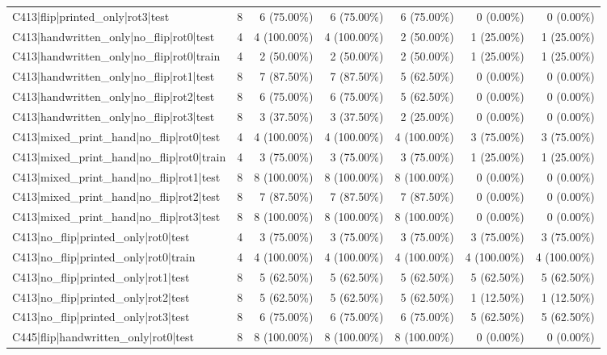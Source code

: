 \begin{longtable}{>{\raggedright\arraybackslash}p{5cm}rrrrrr}
C413|flip|printed\_only|rot3|test & 8 & 6 (75.00\%) & 6 (75.00\%) & 6 (75.00\%) & 0 (0.00\%) & 0 (0.00\%) \\
C413|handwritten\_only|no\_flip|rot0|test & 4 & 4 (100.00\%) & 4 (100.00\%) & 2 (50.00\%) & 1 (25.00\%) & 1 (25.00\%) \\
C413|handwritten\_only|no\_flip|rot0|train & 4 & 2 (50.00\%) & 2 (50.00\%) & 2 (50.00\%) & 1 (25.00\%) & 1 (25.00\%) \\
C413|handwritten\_only|no\_flip|rot1|test & 8 & 7 (87.50\%) & 7 (87.50\%) & 5 (62.50\%) & 0 (0.00\%) & 0 (0.00\%) \\
C413|handwritten\_only|no\_flip|rot2|test & 8 & 6 (75.00\%) & 6 (75.00\%) & 5 (62.50\%) & 0 (0.00\%) & 0 (0.00\%) \\
C413|handwritten\_only|no\_flip|rot3|test & 8 & 3 (37.50\%) & 3 (37.50\%) & 2 (25.00\%) & 0 (0.00\%) & 0 (0.00\%) \\
C413|mixed\_print\_hand|no\_flip|rot0|test & 4 & 4 (100.00\%) & 4 (100.00\%) & 4 (100.00\%) & 3 (75.00\%) & 3 (75.00\%) \\
C413|mixed\_print\_hand|no\_flip|rot0|train & 4 & 3 (75.00\%) & 3 (75.00\%) & 3 (75.00\%) & 1 (25.00\%) & 1 (25.00\%) \\
C413|mixed\_print\_hand|no\_flip|rot1|test & 8 & 8 (100.00\%) & 8 (100.00\%) & 8 (100.00\%) & 0 (0.00\%) & 0 (0.00\%) \\
C413|mixed\_print\_hand|no\_flip|rot2|test & 8 & 7 (87.50\%) & 7 (87.50\%) & 7 (87.50\%) & 0 (0.00\%) & 0 (0.00\%) \\
C413|mixed\_print\_hand|no\_flip|rot3|test & 8 & 8 (100.00\%) & 8 (100.00\%) & 8 (100.00\%) & 0 (0.00\%) & 0 (0.00\%) \\
C413|no\_flip|printed\_only|rot0|test & 4 & 3 (75.00\%) & 3 (75.00\%) & 3 (75.00\%) & 3 (75.00\%) & 3 (75.00\%) \\
C413|no\_flip|printed\_only|rot0|train & 4 & 4 (100.00\%) & 4 (100.00\%) & 4 (100.00\%) & 4 (100.00\%) & 4 (100.00\%) \\
C413|no\_flip|printed\_only|rot1|test & 8 & 5 (62.50\%) & 5 (62.50\%) & 5 (62.50\%) & 5 (62.50\%) & 5 (62.50\%) \\
C413|no\_flip|printed\_only|rot2|test & 8 & 5 (62.50\%) & 5 (62.50\%) & 5 (62.50\%) & 1 (12.50\%) & 1 (12.50\%) \\
C413|no\_flip|printed\_only|rot3|test & 8 & 6 (75.00\%) & 6 (75.00\%) & 6 (75.00\%) & 5 (62.50\%) & 5 (62.50\%) \\
C445|flip|handwritten\_only|rot0|test & 8 & 8 (100.00\%) & 8 (100.00\%) & 8 (100.00\%) & 0 (0.00\%) & 0 (0.00\%) \\

\end{longtable}
